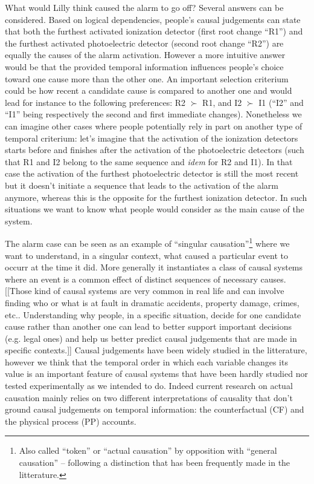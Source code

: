 \documentclass[10pt,letterpaper]{article}
\begin{document}
What would Lilly think caused the alarm to go off? Several answers can be considered. Based on logical dependencies, people's causal judgements can state that both the furthest activated ionization detector (first root change ``R1'') and the furthest activated photoelectric detector (second root change ``R2'') are equally the causes of the alarm activation. However a more intuitive answer would be that the provided temporal information influences people's choice toward one cause more than the other one. An important selection criterium could be how recent a candidate cause is compared to another one and would lead for instance to the following preferences: R2 $\succ$ R1, and I2 $\succ$ I1 (``I2'' and ``I1'' being respectively the second and first immediate changes). Nonetheless we can imagine other cases where people potentially rely in part on another type of temporal criterium: let's imagine that the activation of the ionization detectors starts before and finishes after the activation of the photoelectric detectors (such that R1 and I2 belong to the same sequence and \textit{idem} for R2 and I1). In that case the activation of the furthest photoelectric detector is still the most recent but it doesn't initiate a sequence that leads to the activation of the alarm anymore, whereas this is the opposite for the furthest ionization detector. In such situations we want to know what people would consider as the main cause of the system.

The alarm case can be seen as an example of ``singular causation''\footnote{Also called ``token'' or ``actual causation'' by opposition with ``general causation'' -- following a distinction that has been frequently made in the litterature.} where we want to understand, in a singular context, what caused a particular event to occurr at the time it did. More generally it instantiates a class of causal systems where an event is a common effect of distinct sequences of necessary causes. [[Those kind of causal systems are very common in real life and can involve finding who or what is at fault in dramatic accidents, property damage, crimes, etc..  Understanding why people, in a specific situation, decide for one candidate cause rather than another one can lead to better support important decisions (e.g. legal ones) and help us better predict causal judgements that are made in specific contexts.]] Causal judgements have been widely studied in the litterature, however we think that the temporal order in which each variable changes its value is an important feature of causal systems that have been hardly studied nor tested experimentally as we intended to do. Indeed current research on actual causation mainly relies on two different interpretations of causality that don't ground causal judgements on temporal information: the counterfactual (CF) and the physical process (PP) accounts.
\end{document}
